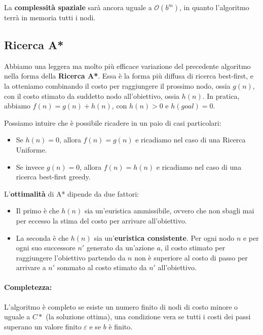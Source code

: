         La \textbf{complessità spaziale} sarà ancora uguale a $\mathcal{O}(b^m)$, in quanto l'algoritmo terrà in memoria tutti i nodi.
        
    \subsection{Ricerca A*}
        Abbiamo una leggera ma molto più efficace variazione del precedente algoritmo nella forma della \textbf{Ricerca A*}. Essa è la forma più diffusa di ricerca best-first, e la otteniamo combinando il costo per raggiungere il prossimo nodo, ossia $g(n)$, con il costo stimato da suddetto nodo all'obiettivo, ossia $h(n)$. In pratica, abbiamo $f(n) = g(n) + h(n)$, con $h(n) > 0$ e $h(goal) = 0$.
        
        Possiamo intuire che è possibile ricadere in un paio di casi particolari:
        \begin{itemize}
            \item Se $h(n) = 0$, allora $f(n) = g(n)$ e ricadiamo nel caso di una Ricerca Uniforme.
            \item Se invece $g(n) = 0$, allora $f(n) = h(n)$ e ricadiamo nel caso di una ricerca best-first greedy.
        \end{itemize}
        
        L'\textbf{ottimalità} di A* dipende da due fattori:
        \begin{itemize}
            \item Il primo è che $h(n)$ sia un'euristica ammissibile, ovvero che non sbagli mai per eccesso la stima del costo per arrivare all'obiettivo.
            \item La seconda è che $h(n)$ sia un'\textbf{euristica consistente}. Per ogni nodo $n$ e per ogni suo successore $n'$ generato da un'azione $a$, il costo stimato per raggiungere l'obiettivo partendo da $n$ non è superiore al costo di passo per arrivare a $n'$ sommato al costo stimato da $n'$ all'obiettivo.
        \end{itemize}
        
        \paragraph{Completezza:} L'algoritmo è completo se esiste un numero finito di nodi di costo minore o uguale a $C*$ (la soluzione ottima), una condizione vera se tutti i costi dei passi superano un valore finito $\varepsilon$ e se $b$ è finito.
        
